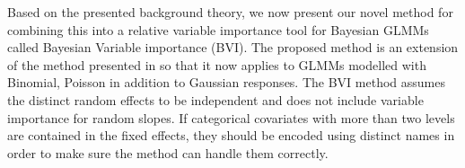 Based on the presented background theory, we now present our novel method for combining this into a relative variable importance tool for Bayesian GLMMs called Bayesian Variable importance (BVI). The proposed method is an extension of the method presented in \citet{Arnstad} so that it now applies to GLMMs modelled with Binomial, Poisson in addition to Gaussian responses. The BVI method assumes the distinct random effects to be independent and does not include variable importance for random slopes.
If categorical covariates with more than two levels are contained in the fixed effects, they should be encoded using distinct names in order to make sure the method can handle them correctly.
